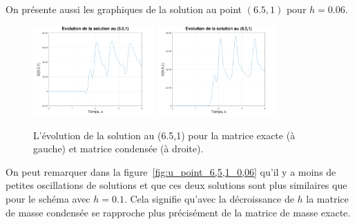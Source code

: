 \documentclass[12pt]{article}
\begin{document}
On présente aussi les graphiques de la solution au point $(6.5,1)$ pour $h=0.06$. 
\begin{figure}[H]
	\hspace{1cm}\includegraphics[width=0.41\textwidth]{images/u_6,5,1_0,06}\hspace{1cm}
	\includegraphics[width=0.41\textwidth]{images/u_6,5,1_0,06_condense}\hspace{1cm}
	\caption{L'évolution de la solution au (6.5,1) pour la matrice exacte (à gauche) et matrice condensée (à droite).}
	\label{fig:u_point_6,5,1_0,06}
\end{figure}
On peut remarquer dans la figure~\eqref{fig:u_point_6,5,1_0,06} qu'il y a moins de petites oscillations de solutions et que ces deux solutions sont plus similaires que pour le schéma avec $h=0.1$. Cela signifie qu'avec la décroissance de $h$ la matrice de masse condensée se rapproche plus précisément de la matrice de masse exacte.
\end{document}
